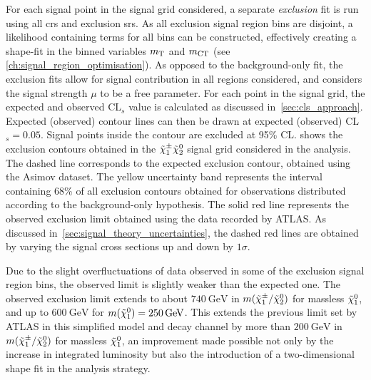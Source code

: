 For each signal point in the signal grid considered, a separate \textit{exclusion} fit is run using all \glspl{cr} and exclusion \glspl{sr}. As all exclusion signal region bins are disjoint, a likelihood containing terms for all bins can be constructed, effectively creating a shape-fit in the binned variables $m_{\textrm{T}}$ and $m_{\textrm{CT}}$ (see \cref{ch:signal_region_optimisation}). As opposed to the background-only fit, the exclusion fits allow for signal contribution in all regions considered, and considers the signal strength $\mu$ to be a free parameter. For each point in the signal grid, the expected and observed CL$_s$ value is calculated as discussed in~\cref{sec:cls_approach}. Expected (observed) contour lines can then be drawn at expected (observed) CL$_s =0.05$. Signal points inside the contour are excluded at 95\% CL.  shows the exclusion contours obtained in the $\tilde{\chi}_1^\pm\tilde{\chi}_2^0$ signal grid considered in the analysis. The dashed line corresponds to the expected exclusion contour, obtained using the Asimov dataset. The yellow uncertainty band represents the interval containing 68\% of all exclusion contours obtained for observations distributed according to the background-only hypothesis. The solid red line represents the observed exclusion limit obtained using the data recorded by ATLAS. As discussed in~\cref{sec:signal_theory_uncertainties}, the dashed red lines are obtained by varying the signal cross sections up and down by $1\sigma$.

Due to the slight overfluctuations of data observed in some of the exclusion signal region bins, the observed limit is slightly weaker than the expected one. The observed exclusion limit extends to about $\SI{740}{\GeV}$ in $m(\tilde{\chi}_1^\pm/\tilde{\chi}_2^0)$ for massless $\tilde{\chi}_1^0$, and up to $\SI{600}{\GeV}$ for $m(\lsp)=\SI{250}{\GeV}$. This extends the previous limit set by ATLAS in this simplified model and decay channel by more than $\SI{200}{\GeV}$ in $m(\tilde{\chi}_1^\pm/\tilde{\chi}_2^0)$ for massless $\tilde{\chi}_1^0$, an improvement made possible not only by the increase in integrated luminosity but also the introduction of a two-dimensional shape fit in the analysis strategy. 

